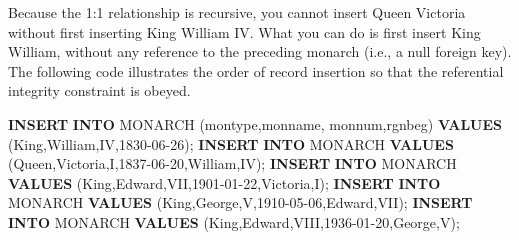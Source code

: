 \documentclass[
]{article}
\newenvironment{Shaded}{\begin{snugshade}}{\end{snugshade}}
\newcommand{\KeywordTok}[1]{\textcolor[rgb]{0.13,0.29,0.53}{\textbf{#1}}}
\newcommand{\NormalTok}[1]{#1}
\newcommand{\StringTok}[1]{\textcolor[rgb]{0.31,0.60,0.02}{#1}}
\begin{document}
Because the 1:1 relationship is recursive, you cannot insert Queen
Victoria without first inserting King William IV. What you can do is
first insert King William, without any reference to the preceding
monarch (i.e., a null foreign key). The following code illustrates the
order of record insertion so that the referential integrity constraint
is obeyed.

\begin{Shaded}
\begin{Highlighting}[]
\KeywordTok{INSERT} \KeywordTok{INTO}\NormalTok{ MONARCH (montype,monname, monnum,rgnbeg) }\KeywordTok{VALUES}\NormalTok{ (}\StringTok{\textquotesingle{}King\textquotesingle{}}\NormalTok{,}\StringTok{\textquotesingle{}William\textquotesingle{}}\NormalTok{,}\StringTok{\textquotesingle{}IV\textquotesingle{}}\NormalTok{,}\StringTok{\textquotesingle{}1830{-}06{-}26\textquotesingle{}}\NormalTok{);}
\KeywordTok{INSERT} \KeywordTok{INTO}\NormalTok{ MONARCH }\KeywordTok{VALUES}\NormalTok{ (}\StringTok{\textquotesingle{}Queen\textquotesingle{}}\NormalTok{,}\StringTok{\textquotesingle{}Victoria\textquotesingle{}}\NormalTok{,}\StringTok{\textquotesingle{}I\textquotesingle{}}\NormalTok{,}\StringTok{\textquotesingle{}1837{-}06{-}20\textquotesingle{}}\NormalTok{,}\StringTok{\textquotesingle{}William\textquotesingle{}}\NormalTok{,}\StringTok{\textquotesingle{}IV\textquotesingle{}}\NormalTok{);}
\KeywordTok{INSERT} \KeywordTok{INTO}\NormalTok{ MONARCH }\KeywordTok{VALUES}\NormalTok{ (}\StringTok{\textquotesingle{}King\textquotesingle{}}\NormalTok{,}\StringTok{\textquotesingle{}Edward\textquotesingle{}}\NormalTok{,}\StringTok{\textquotesingle{}VII\textquotesingle{}}\NormalTok{,}\StringTok{\textquotesingle{}1901{-}01{-}22\textquotesingle{}}\NormalTok{,}\StringTok{\textquotesingle{}Victoria\textquotesingle{}}\NormalTok{,}\StringTok{\textquotesingle{}I\textquotesingle{}}\NormalTok{);}
\KeywordTok{INSERT} \KeywordTok{INTO}\NormalTok{ MONARCH }\KeywordTok{VALUES}\NormalTok{ (}\StringTok{\textquotesingle{}King\textquotesingle{}}\NormalTok{,}\StringTok{\textquotesingle{}George\textquotesingle{}}\NormalTok{,}\StringTok{\textquotesingle{}V\textquotesingle{}}\NormalTok{,}\StringTok{\textquotesingle{}1910{-}05{-}06\textquotesingle{}}\NormalTok{,}\StringTok{\textquotesingle{}Edward\textquotesingle{}}\NormalTok{,}\StringTok{\textquotesingle{}VII\textquotesingle{}}\NormalTok{);}
\KeywordTok{INSERT} \KeywordTok{INTO}\NormalTok{ MONARCH }\KeywordTok{VALUES}\NormalTok{ (}\StringTok{\textquotesingle{}King\textquotesingle{}}\NormalTok{,}\StringTok{\textquotesingle{}Edward\textquotesingle{}}\NormalTok{,}\StringTok{\textquotesingle{}VIII\textquotesingle{}}\NormalTok{,}\StringTok{\textquotesingle{}1936{-}01{-}20\textquotesingle{}}\NormalTok{,}\StringTok{\textquotesingle{}George\textquotesingle{}}\NormalTok{,}\StringTok{\textquotesingle{}V\textquotesingle{}}\NormalTok{);}

\end{Highlighting}
\end{Shaded}
\end{document}
